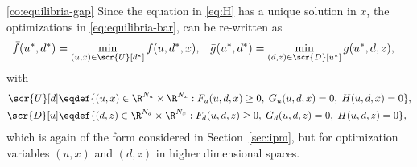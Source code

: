 \documentclass[11pt]{article}
\begin{document}
\begin{proof-corollary}{\ref{co:equilibria-gap}}
  Since the equation in \eqref{eq:H} has a unique solution in $x$, the
  optimizations in \eqref{eq:equilibria-bar}, can be re-written as
  \begin{align}\label{eq:equilibria-x}
    \bar f(u^*,d^*)&=\min_{(u,x)\in\scr{U}[d^*]} f(u,d^*,x), &
    \bar g(u^*,d^*)&=\min_{(d,z)\in\scr{D}[u^*]} g(u^*,d,z),
  \end{align}
  with
  \begin{align}
    \scr{U}[d]&\eqdef\{(u,x)\in\R^{N_u}\times\R^{N_x}: F_u(u,d,x)\ge 0,\; G_u(u,d,x)=0,\;H(u,d,x)=0\}, \\
    \scr{D}[u]&\eqdef\{(d,z)\in\R^{N_d}\times\R^{N_x}: F_d(u,d,z)\ge 0,\; G_d(u,d,z)=0,\;H(u,d,z)=0\},
  \end{align}
  which is again of the form considered in Section~\ref{sec:ipm}, but
  for optimization variables $(u,x)$ and $(d,z)$ in higher dimensional
  spaces.
  
  \medskip
  

\end{proof-corollary}
\end{document}
